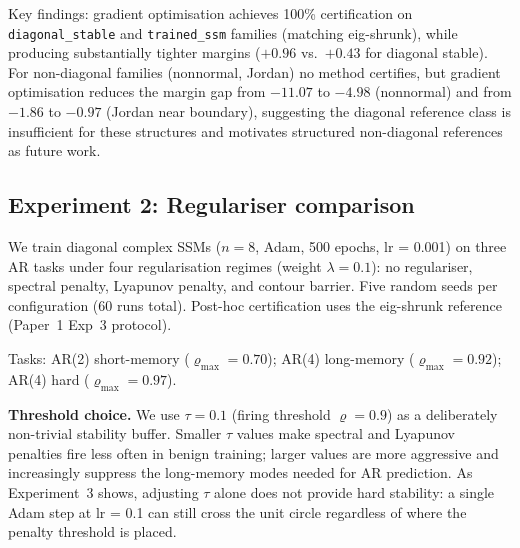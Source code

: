 \documentclass{article}
\theoremstyle{definition}
\begin{document}
Key findings: gradient optimisation achieves 100\% certification on
\texttt{diagonal\_stable} and \texttt{trained\_ssm} families (matching
eig-shrunk), while producing substantially tighter margins
($+0.96$ vs.\ $+0.43$ for diagonal stable).  For non-diagonal families
(nonnormal, Jordan) no method certifies, but gradient optimisation
reduces the margin gap from $-11.07$ to $-4.98$ (nonnormal) and from
$-1.86$ to $-0.97$ (Jordan near boundary), suggesting the diagonal
reference class is insufficient for these structures and motivates
structured non-diagonal references as future work.

\subsection{Experiment 2: Regulariser comparison}

We train diagonal complex SSMs ($n = 8$, Adam, 500 epochs, lr = 0.001)
on three AR tasks under four regularisation regimes (weight $\lambda = 0.1$):
no regulariser, spectral penalty, Lyapunov penalty, and contour barrier.
Five random seeds per configuration (60 runs total).
Post-hoc certification uses the eig-shrunk reference (Paper~1 Exp~3 protocol).

Tasks: AR(2) short-memory ($\varrho_{\max} = 0.70$);
AR(4) long-memory ($\varrho_{\max} = 0.92$);
AR(4) hard ($\varrho_{\max} = 0.97$).

\noindent\textbf{Threshold choice.}
We use $\tau = 0.1$ (firing threshold $\varrho = 0.9$) as a deliberately
non-trivial stability buffer.  Smaller $\tau$ values make spectral and
Lyapunov penalties fire less often in benign training; larger values are
more aggressive and increasingly suppress the long-memory modes needed for
AR prediction.  As Experiment~3 shows, adjusting $\tau$ alone does not
provide hard stability: a single Adam step at lr = 0.1 can still cross the
unit circle regardless of where the penalty threshold is placed.
\end{document}
